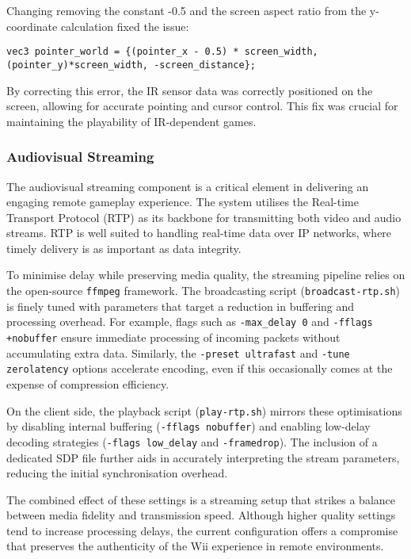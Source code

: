 Changing removing the constant -0.5 and the screen aspect ratio from the y-coordinate calculation fixed the issue:
\begin{lstlisting}[style=CStyle, emph={vec3}, emphstyle={\color{magenta}}]
vec3 pointer_world = {(pointer_x - 0.5) * screen_width, (pointer_y)*screen_width, -screen_distance};
\end{lstlisting}

By correcting this error, the IR sensor data was correctly positioned on the screen, allowing for accurate pointing and cursor control. This fix was crucial for maintaining the playability of IR-dependent games.

\subsubsection{Audiovisual Streaming}

The audiovisual streaming component is a critical element in delivering an
engaging remote gameplay experience. The system utilises the Real-time Transport
Protocol (RTP) as its backbone for transmitting both video and audio streams.
RTP is well suited to handling real-time data over IP networks,
where timely delivery is as important as data integrity.

To minimise delay while preserving media quality, the streaming pipeline relies
on the open-source \texttt{ffmpeg} framework. The broadcasting script
(\texttt{broadcast-rtp.sh}) is finely tuned with parameters that target a
reduction in buffering and processing overhead. For example, flags such as
\texttt{-max\_delay 0} and \texttt{-fflags +nobuffer} ensure immediate
processing of incoming packets without accumulating extra data. Similarly, the
\texttt{-preset ultrafast} and \texttt{-tune zerolatency} options accelerate
encoding, even if this occasionally comes at the expense of compression
efficiency.

On the client side, the playback script (\texttt{play-rtp.sh}) mirrors these
optimisations by disabling internal buffering (\texttt{-fflags nobuffer}) and
enabling low-delay decoding strategies (\texttt{-flags low\_delay} and
\texttt{-framedrop}). The inclusion of a dedicated SDP file further aids in
accurately interpreting the stream parameters, reducing the initial
synchronisation overhead.

The combined effect of these settings is a streaming setup that strikes a
balance between media fidelity and transmission speed. Although higher quality
settings tend to increase processing delays, the current configuration offers a
compromise that preserves the authenticity of the Wii experience in remote
environments. %

